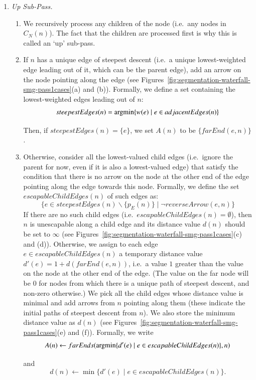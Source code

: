 \documentclass[preprint,a4paper]{elsarticle}
\newcommand{\argmin}{\operatornamewithlimits{argmin}}
\begin{document}
\begin{enumerate}

\item \emph{Up Sub-Pass.}

\begin{enumerate}
\item We recursively process any children of the node (i.e.~any nodes in $C_N(n)$). The fact that the children are processed first is why this is called an `up' sub-pass.

\item If $n$ has a unique edge of steepest descent (i.e.~a unique lowest-weighted edge leading out of it, which can be the parent edge), add an arrow on the node pointing along the edge (see Figures~\ref{fig:segmentation-waterfall-smg-pass1cases}(a) and (b)). Formally, we define a set containing the lowest-weighted edges leading out of $n$:
%
\[
steepestEdges(n) = \argmin_{}\{w(e) \; | \; e \in adjacentEdges(n)\}
\]
%
Then, if $steepestEdges(n) = \{e\}$, we set $A(n)$ to be $\{farEnd(e,n)\}$.

\item Otherwise, consider all the lowest-valued child edges (i.e.~ignore the parent for now, even if it is also a lowest-valued edge) that satisfy the condition that there is no arrow on the node at the other end of the edge pointing along the edge towards this node. Formally, we define the set $escapableChildEdges(n)$ of such edges as:
%
\[
\{e \in steepestEdges(n) \backslash \{p_E(n)\} \; | \; \neg reverseArrow(e,n)\}
\]
%
If there are no such child edges (i.e.~$escapableChildEdges(n) = \emptyset$), then $n$ is unescapable along a child edge and its distance value $d(n)$ should be set to $\infty$ (see Figures~\ref{fig:segmentation-waterfall-smg-pass1cases}(c) and (d)). Otherwise, we assign to each edge $e \in escapableChildEdges(n)$ a temporary distance value $d'(e) = 1 + d(farEnd(e,n))$, i.e.~a value $1$ greater than the value on the node at the other end of the edge. (The value on the far node will be $0$ for nodes from which there is a unique path of steepest descent, and non-zero otherwise.) We pick all the child edges whose distance value is minimal and add arrows from $n$ pointing along them (these indicate the initial paths of steepest descent from $n$). We also store the minimum distance value as $d(n)$ (see Figures~\ref{fig:segmentation-waterfall-smg-pass1cases}(e) and (f)). Formally, we write
%
\[
A(n) \leftarrow farEnds(\argmin_{}\{d'(e) \; | \; e \in escapableChildEdges(n)\}, n)
\]
%
and
\[
d(n) \leftarrow \min_{}\{d'(e) \; | \; e \in escapableChildEdges(n)\}.
\]


\end{enumerate}
\end{enumerate}
\end{document}
